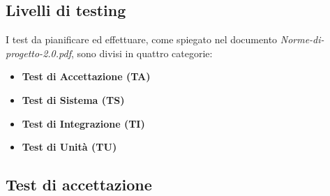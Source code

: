 \documentclass[a4paper,11pt]{article}
\begin{document}
\subsection{Livelli di testing}
I test da pianificare ed effettuare, come spiegato nel documento \textit{Norme-di-progetto-2.0.pdf}, sono divisi in quattro categorie:
\begin{itemize}
\item \textbf{Test di Accettazione (TA)}
\item \textbf{Test di Sistema (TS)}
\item \textbf{Test di Integrazione (TI)}
\item \textbf{Test di Unità (TU)}
\end{itemize}
\subsection{Test di accettazione}
	
\end{document}
